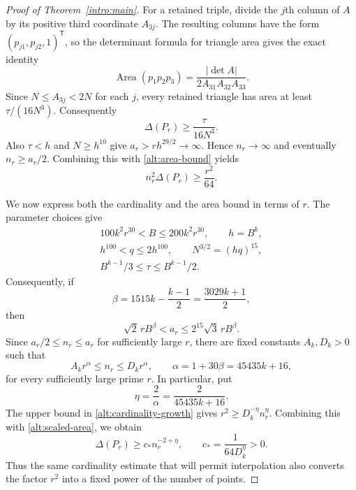 \begin{proof}[Proof of Theorem~\ref{intro:main}]
For a retained triple, divide the $j$th column of $A$ by its positive
third coordinate $A_{3j}$.  The resulting columns have the form
$(p_{j1},p_{j2},1)^{\mathsf T}$, so the determinant formula for triangle
area gives the exact identity
\begin{equation}\label{alt:area-identity}
 \operatorname{Area}(p_1p_2p_3)
 =\frac{|\det A|}{2A_{31}A_{32}A_{33}}.
\end{equation}
Since $N\le A_{3j}<2N$ for each $j$, every retained triangle has area at
least $\tau/(16N^3)$.  Consequently
\begin{equation}\label{alt:area-bound}
 \Delta(P_r)\ge\frac{\tau}{16N^3}.
\end{equation}
Also $\tau<h$ and $N\ge h^{10}$ give
$a_r>rh^{29/2}\to\infty$.  Hence $n_r\to\infty$ and eventually
$n_r\ge a_r/2$.  Combining this with \eqref{alt:area-bound} yields
\begin{equation}\label{alt:scaled-area}
 n_r^2\Delta(P_r)\ge\frac{r^2}{64}.
\end{equation}

We now express both the cardinality and the area bound in terms of $r$.
The parameter choices give
\[
 \begin{gathered}
  100k^2r^{30}<B\le200k^2r^{30},\qquad h=B^k,\\
  h^{100}<q\le2h^{100},\qquad N^{3/2}=(hq)^{15},\\
  B^{k-1}/3\le\tau\le B^{k-1}/2.
 \end{gathered}
\]
Consequently, if
\[
 \beta=1515k-\frac{k-1}{2}=\frac{3029k+1}{2},
\]
then
\[
 \sqrt{2}\,rB^\beta<a_r\le2^{15}\sqrt{3}\,rB^\beta.
\]
Since $a_r/2\le n_r\le a_r$ for sufficiently large $r$, there are fixed
constants $A_k,D_k>0$ such that
\begin{equation}\label{alt:cardinality-growth}
 A_kr^\alpha\le n_r\le D_kr^\alpha,
 \qquad \alpha=1+30\beta=45435k+16,
\end{equation}
for every sufficiently large prime $r$. In particular, put
\begin{equation}\label{alt:exponent}
 \eta=\frac2\alpha=\frac{2}{45435k+16}.
\end{equation}
The upper bound in \eqref{alt:cardinality-growth} gives
$r^2\ge D_k^{-\eta}n_r^\eta$. Combining this with
\eqref{alt:scaled-area}, we obtain
\begin{equation}\label{alt:prime-area}
 \Delta(P_r)\ge c_*n_r^{-2+\eta},
 \qquad c_*=\frac1{64D_k^\eta}>0.
\end{equation}
Thus the same cardinality estimate that will permit interpolation also
converts the factor $r^2$ into a fixed power of the number of points.


\end{proof}
